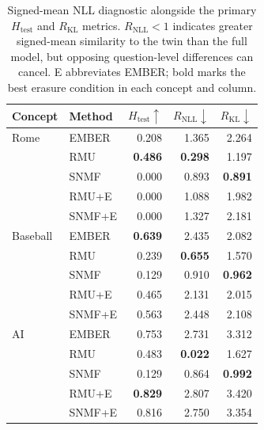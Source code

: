 \begin{table}[h]
  \centering
  \small
  \begin{tabular}{llrrr}
    \toprule
    Concept & Method & $H_{\mathrm{test}}\uparrow$ & $R_{\mathrm{NLL}}\downarrow$ & $R_{\mathrm{KL}}\downarrow$ \\
    \midrule
    Rome & EMBER & 0.208 & 1.365 & 2.264 \\
         & RMU   & \textbf{0.486} & \textbf{0.298} & 1.197 \\
         & SNMF  & 0.000 & 0.893 & \textbf{0.891} \\
         & RMU+E & 0.000 & 1.088 & 1.982 \\
         & SNMF+E & 0.000 & 1.327 & 2.181 \\
    \midrule
    Baseball & EMBER & \textbf{0.639} & 2.435 & 2.082 \\
             & RMU   & 0.239 & \textbf{0.655} & 1.570 \\
             & SNMF  & 0.129 & 0.910 & \textbf{0.962} \\
             & RMU+E & 0.465 & 2.131 & 2.015 \\
             & SNMF+E & 0.563 & 2.448 & 2.108 \\
    \midrule
    AI & EMBER & 0.753 & 2.731 & 3.312 \\
       & RMU   & 0.483 & \textbf{0.022} & 1.627 \\
       & SNMF  & 0.129 & 0.864 & \textbf{0.992} \\
       & RMU+E & \textbf{0.829} & 2.807 & 3.420 \\
       & SNMF+E & 0.816 & 2.750 & 3.354 \\
    \bottomrule
  \end{tabular}
  \caption{Signed-mean NLL diagnostic alongside the primary
  $H_{\mathrm{test}}$ and $R_{\mathrm{KL}}$ metrics. $R_{\mathrm{NLL}}<1$
  indicates greater signed-mean similarity to the twin than the full model,
  but opposing question-level differences can cancel. E abbreviates EMBER;
  bold marks the best erasure condition in each concept and column.}
  \label{tab:metric-agreement}
\end{table}

